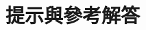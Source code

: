 \documentclass[11pt,a4paper]{article}
\numberwithin{equation}{section}
\begin{document}

\clearpage
\section*{提示與參考解答}

\end{document}
